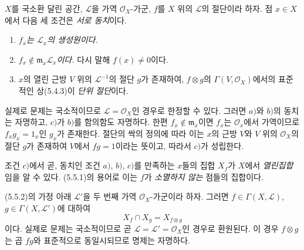 \begin{env}[5.5.2]
\label{0.5.5.2-ko}
$X$를 국소환 달린 공간, $\mathcal L$을 가역
$\mathcal O_X$-가군, $f$를 $X$ 위의 $\mathcal L$의 절단이라 하자.
점 $x\in X$에서 다음 세 조건은 \emph{서로 동치}이다.
\begin{enumerate}
  \item[$a)$] \emph{$f_x$는 $\mathcal L_x$의 생성원이다.}
  \item[$b)$] \emph{$f_x\notin\mathfrak m_x\mathcal L_x$이다.} 다시
    말해 $f(x)\neq0$이다.
  \item[$c)$] $x$의 열린 근방 $V$ 위의 $\mathcal L^{-1}$의 절단
    $g$가 존재하여, $f\otimes g$의
    $\Gamma(V,\mathcal O_X)$에서의 표준적인 상(5.4.3)이
    \emph{단위 절단}이다.
\end{enumerate}

실제로 문제는 국소적이므로 $\mathcal L=\mathcal O_X$인 경우로
한정할 수 있다. 그러면 $a)$와 $b)$의 동치는 자명하고, $c)$가
$b)$를 함의함도 자명하다. 한편
$f_x\notin\mathfrak m_x$이면 $f_x$는 $\mathcal O_x$에서 가역이므로
$f_xg_x=1_x$인 $g_x$가 존재한다. 절단의 싹의 정의에 따라 이는
$x$의 근방 $V$와 $V$ 위의 $\mathcal O_X$의 절단 $g$가 존재하여
$V$에서 $fg=1$이라는 뜻이고, 따라서 $c)$가 성립한다.

조건 $c)$에서 곧, 동치인 조건 $a)$, $b)$, $c)$를 만족하는
$x$들의 집합 $X_f$가 $X$에서 \emph{열린집합}임을 알 수 있다.
(5.5.1)의 용어로 이는 $f$가 \emph{소멸하지 않는} 점들의 집합이다.
\end{env}

\begin{env}[5.5.3]
\label{0.5.5.3-ko}
(5.5.2)의 가정 아래 $\mathcal L'$을 두 번째 가역
$\mathcal O_X$-가군이라 하자. 그러면
$f\in\Gamma(X,\mathcal L)$, $g\in\Gamma(X,\mathcal L')$에 대하여
\[
  X_f\cap X_g=X_{f\otimes g}
\]
이다. 실제로 문제는 국소적이므로 곧
$\mathcal L=\mathcal L'=\mathcal O_X$인 경우로 환원된다.
이 경우 $f\otimes g$는 곱 $fg$와 표준적으로 동일시되므로 명제는
자명하다.
\end{env}



